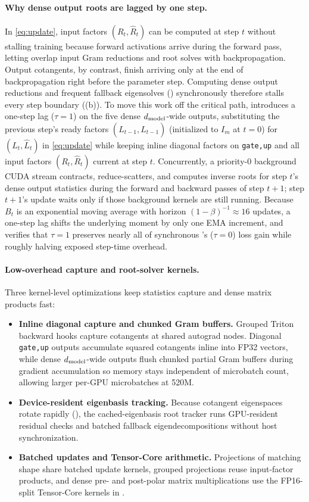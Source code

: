 \paragraph{Why dense output roots are lagged by one step.}
In \cref{eq:update}, input factors $(R_t,\hat R_t)$ can be computed at step $t$ without stalling training because forward activations arrive during the forward pass, letting  overlap input Gram reductions and root solves with backpropagation. Output cotangents, by contrast, finish arriving only at the end of backpropagation right before the parameter step. Computing dense output reductions and frequent fallback eigensolves () synchronously therefore stalls every step boundary ((b)). To move this work off the critical path,  introduces a one-step lag ($\tau=1$) on the five dense $d_{\mathrm{model}}$-wide outputs, substituting the previous step's ready factors $(L_{t-1},\hat L_{t-1})$ (initialized to $I_m$ at $t=0$) for $(L_t,\hat L_t)$ in \cref{eq:update} while keeping inline diagonal factors on \texttt{gate,up} and all input factors $(R_t,\hat R_t)$ current at step $t$. Concurrently, a priority-0 background CUDA stream contracts, reduce-scatters, and computes inverse roots for step $t$'s dense output statistics during the forward and backward passes of step $t+1$; step $t+1$'s update waits only if those background kernels are still running. Because $B_t$ is an exponential moving average with horizon $(1-\beta)^{-1}\approx 16$ updates, a one-step lag shifts the underlying moment by only one EMA increment, and  verifies that $\tau=1$ preserves nearly all of synchronous 's ($\tau=0$) loss gain while roughly halving exposed step-time overhead.

\paragraph{Low-overhead capture and root-solver kernels.}
Three kernel-level optimizations keep statistics capture and dense matrix products fast:
\begin{itemize}
 \item \textbf{Inline diagonal capture and chunked Gram buffers.} Grouped Triton backward hooks capture cotangents at shared autograd nodes. Diagonal \texttt{gate,up} outputs accumulate squared cotangents inline into FP32 vectors, while dense $d_{\mathrm{model}}$-wide outputs flush chunked partial Gram buffers during gradient accumulation so memory stays independent of microbatch count, allowing larger per-GPU microbatches at 520M.
 \item \textbf{Device-resident eigenbasis tracking.} Because cotangent eigenspaces rotate rapidly (), the cached-eigenbasis root tracker runs GPU-resident residual checks and batched fallback eigendecompositions without host synchronization.
 \item \textbf{Batched updates and Tensor-Core arithmetic.} Projections of matching shape share batched update kernels, grouped projections reuse input-factor products, and dense pre- and post-polar matrix multiplications use the FP16-split Tensor-Core kernels in .
\end{itemize}
